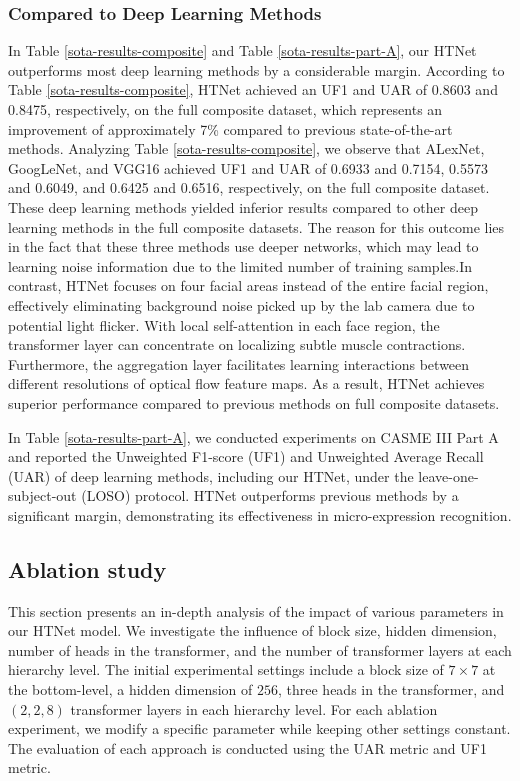 \documentclass[review,12pt, 3p]{elsarticle}
\begin{document}
\subsubsection{Compared to Deep Learning Methods}
In Table \ref{sota-results-composite} and Table \ref{sota-results-part-A}, our HTNet outperforms most deep learning methods by a considerable margin. According to Table \ref{sota-results-composite}, HTNet achieved an UF1 and UAR of 0.8603 and 0.8475, respectively, on the full composite dataset, which represents an improvement of approximately 7\% compared to previous state-of-the-art methods. Analyzing Table \ref{sota-results-composite}, we observe that ALexNet, GoogLeNet, and VGG16 achieved UF1 and UAR of 0.6933 and 0.7154, 0.5573 and 0.6049, and 0.6425 and 0.6516, respectively, on the full composite dataset. These deep learning methods yielded inferior results compared to other deep learning methods in the full composite datasets. The reason for this outcome lies in the fact that these three methods use deeper networks, which may lead to learning noise information due to the limited number of training samples.In contrast, HTNet focuses on four facial areas instead of the entire facial region, effectively eliminating background noise picked up by the lab camera due to potential light flicker. With local self-attention in each face region, the transformer layer can concentrate on localizing subtle muscle contractions. Furthermore, the aggregation layer facilitates learning interactions between different resolutions of optical flow feature maps. As a result, HTNet achieves superior performance compared to previous methods on full composite datasets.

In Table \ref{sota-results-part-A}, we conducted experiments on CASME III Part A and reported the Unweighted F1-score (UF1) and Unweighted Average Recall (UAR) of deep learning methods, including our HTNet, under the leave-one-subject-out (LOSO) protocol. HTNet outperforms previous methods by a significant margin, demonstrating its effectiveness in micro-expression recognition.

\subsection {Ablation study}
This section presents an in-depth analysis of the impact of various parameters in our HTNet model. We investigate the influence of block size, hidden dimension, number of heads in the transformer, and the number of transformer layers at each hierarchy level. The initial experimental settings include a block size of $7\times 7$ at the bottom-level, a hidden dimension of $256$, three heads in the transformer, and $(2,2,8)$ transformer layers in each hierarchy level. For each ablation experiment, we modify a specific parameter while keeping other settings constant. The evaluation of each approach is conducted using the UAR metric and UF1 metric.
\end{document}

